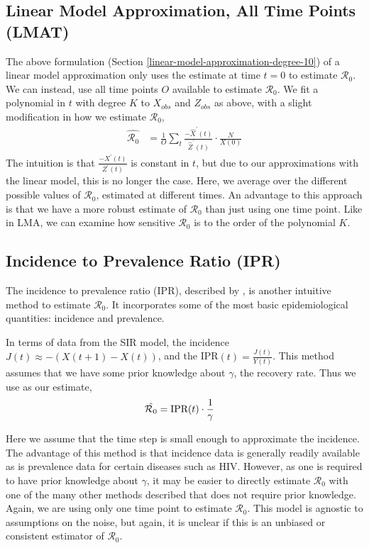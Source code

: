\documentclass[12pt]{article}
\newcommand{\rr}{\ensuremath{\mathcal{R}_0}}
\begin{document}
\subsection{Linear Model Approximation, All Time Points (LMAT)}\label{linear-model-approximation-all-time-points-degree-10}

The above formulation (Section \ref{linear-model-approximation-degree-10}) of a linear model approximation only uses the estimate at time $t=0$ to estimate $\rr$.  We can instead, use all time points $O$ available to estimate $\rr$.  We fit a polynomial in \(t\) with degree \(K\) to \(X_{obs}\)
and \(Z_{obs}\) as above, with a slight modification in how we estimate
\(\rr\),
\begin{align*}
  \hat{\rr} &= \frac{1}{O} \sum_t \frac{-\hat{X}^\prime(t)}{\hat{Z}^\prime(t)} \cdot \frac{N}{X(0)} 
\end{align*}
The intuition is that $\frac{-X^\prime(t)}{Z^\prime(t)}$ is constant in $t$, but due to our approximations with the linear model, this is no longer the case.  Here, we average over the different possible values of $\rr$, estimated at different times.  An advantage to this approach is that we have a more robust estimate of $\rr$ than just using one time point.  Like in LMA, we can examine how sensitive $\rr$ is to the order of the polynomial $K$.


\subsection{Incidence to Prevalence Ratio (IPR)}\label{incidence-to-prevalence-ratio}
The incidence to prevalence ratio (IPR), described by \cite{Nishiura2009}, is another intuitive method to estimate $\rr$.  It incorporates some of the most basic epidemiological quantities: incidence and prevalence.

In terms of data from the SIR model, the incidence $J(t) \approx -(X(t+1) - X(t))$, and the IPR$(t) = \frac{J(t)}{Y(t)}$.  This method assumes that we have some prior knowledge about $\gamma$, the recovery rate.  Thus we use as our estimate,
\begin{align*}
\hat{\rr} &= \textnormal{IPR}(t) \cdot \frac{1}{\gamma}
\end{align*}

Here we assume that the time step is small enough to approximate the incidence.  The advantage of this method is that incidence data is generally readily available as is prevalence data for certain diseases such as HIV.  However, as one is required to have prior knowledge about $\gamma$, it may be easier to directly estimate $\rr$ with one of the many other methods described that does not require  prior knowledge.  Again, we are using only one time point to estimate $\rr$.  This model is agnostic to assumptions on the noise, but again, it is unclear if this is an unbiased or consistent estimator of $\rr$.
\end{document}
